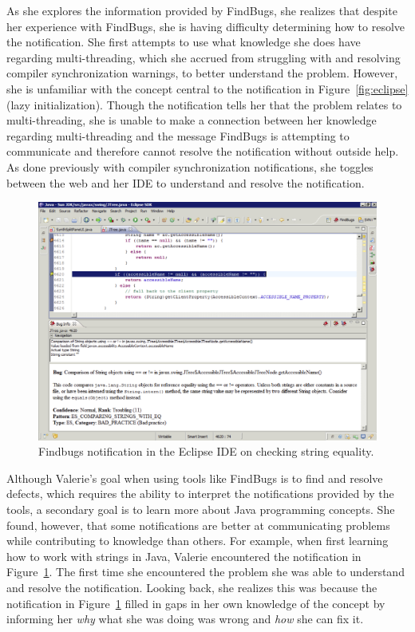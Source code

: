 \documentclass{llncs}
\begin{document}
As she explores the information provided by FindBugs, she realizes that despite her experience with FindBugs, she is having difficulty determining how to resolve the notification. She first attempts to use what knowledge she does have regarding multi-threading, which she accrued from struggling with and resolving compiler synchronization warnings, to better understand the problem. 
However, she is unfamiliar with the concept central to the notification in Figure~\ref{fig:eclipse} (lazy initialization). Though the notification tells her that the problem relates to multi-threading, she is unable to make a connection between her knowledge regarding multi-threading and the message FindBugs is attempting to communicate and therefore cannot resolve the notification without outside help. As done previously with compiler synchronization notifications, she toggles between the web and her IDE to understand and resolve the notification.


\begin{figure} 
	\centering
	\includegraphics[width=\textwidth]{figs/eclipse-2.png}
	\caption{Findbugs notification in the Eclipse IDE on checking string equality.}
	\label{fig:eclipse2}
\end{figure}

Although Valerie's goal when using tools like FindBugs is to find and resolve defects, which requires the ability to interpret the notifications provided by the tools, a secondary goal is to learn more about Java programming concepts. She found, however, that some notifications are better at communicating problems while contributing to knowledge than others. For example, when first learning how to work with strings in Java, Valerie encountered the notification in Figure~\ref{fig:eclipse2}. The first time she encountered the problem she was able to understand and resolve the notification. Looking back, she realizes this was because the notification in Figure~\ref{fig:eclipse2} filled in gaps in her own knowledge of the concept by informing her \emph{why} what she was doing was wrong and \emph{how} she can fix it.
\end{document}
